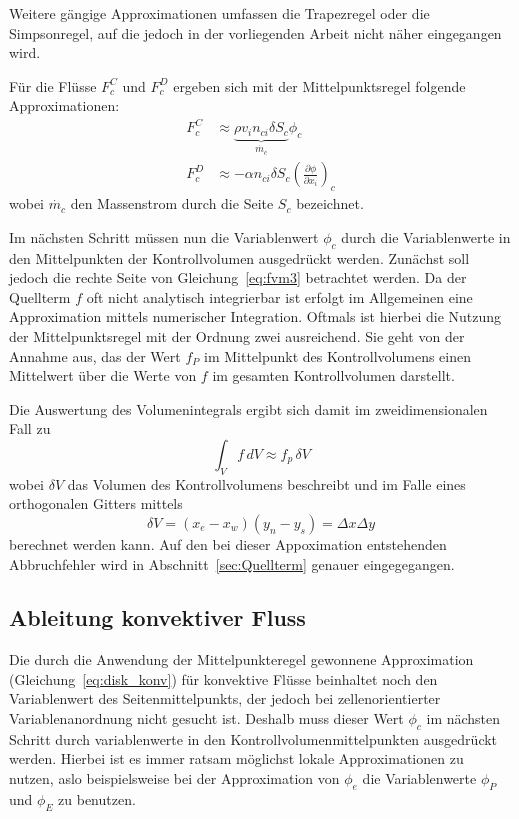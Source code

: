 Weitere gängige Approximationen umfassen die Trapezregel oder die Simpsonregel, auf die jedoch
in der vorliegenden Arbeit nicht näher eingegangen wird.

Für die Flüsse $F_c^C$ und $F_c^D$ ergeben sich mit der Mittelpunktsregel folgende Approximationen:
\begin{align}
  F_c^C &\approx \underbrace{\rho v_i n_{ci} \delta S_c}_{\dot{m_c}}  \phi_c \label{eq:disk_konv}\\
  F_c^D &\approx  -\alpha  n_{ci} \delta S_c \left(\frac{\partial \phi}{\partial x_i}\right)_c
\end{align}
wobei $\dot{m_c}$ den Massenstrom durch die Seite $S_c$ bezeichnet.

Im nächsten Schritt müssen nun die Variablenwert $\phi_c$ durch die Variablenwerte in den
Mittelpunkten der Kontrollvolumen ausgedrückt werden.
Zunächst soll jedoch die rechte Seite von Gleichung~\eqref{eq:fvm3} betrachtet werden.
Da der Quellterm $f$ oft nicht analytisch integrierbar ist erfolgt im Allgemeinen eine Approximation
mittels numerischer Integration. Oftmals ist hierbei die Nutzung der Mittelpunktsregel mit der Ordnung zwei
ausreichend. Sie geht von der Annahme aus, das der Wert $f_P$ im Mittelpunkt des Kontrollvolumens
einen Mittelwert über die Werte von $f$ im gesamten Kontrollvolumen darstellt.

Die Auswertung des Volumenintegrals ergibt sich damit im zweidimensionalen Fall zu
\begin{equation}
  \int_V f\,dV \approx f_p\,\delta V
\end{equation}
wobei $\delta V$ das Volumen des Kontrollvolumens beschreibt und im Falle eines orthogonalen Gitters
mittels
\begin{equation}
  \delta V = (x_e - x_w)(y_n-y_s) = \Delta x \Delta y
\end{equation}
berechnet werden kann. Auf den bei dieser Appoximation entstehenden Abbruchfehler wird in
Abschnitt~\ref{sec:Quellterm} genauer eingegegangen.


\subsection{Ableitung konvektiver Fluss}

Die durch die Anwendung der Mittelpunkteregel gewonnene Approximation (Gleichung~\ref{eq:disk_konv}) für konvektive
Flüsse beinhaltet noch den Variablenwert des Seitenmittelpunkts, der jedoch bei
zellenorientierter Variablenanordnung nicht gesucht ist. Deshalb muss dieser Wert $\phi_c$ im
nächsten Schritt durch variablenwerte in den Kontrollvolumenmittelpunkten ausgedrückt werden.
Hierbei ist es immer ratsam möglichst lokale Approximationen zu nutzen, aslo beispielsweise
bei der Approximation von $\phi_e$ die Variablenwerte $\phi_P$ und $\phi_E$ zu benutzen.

